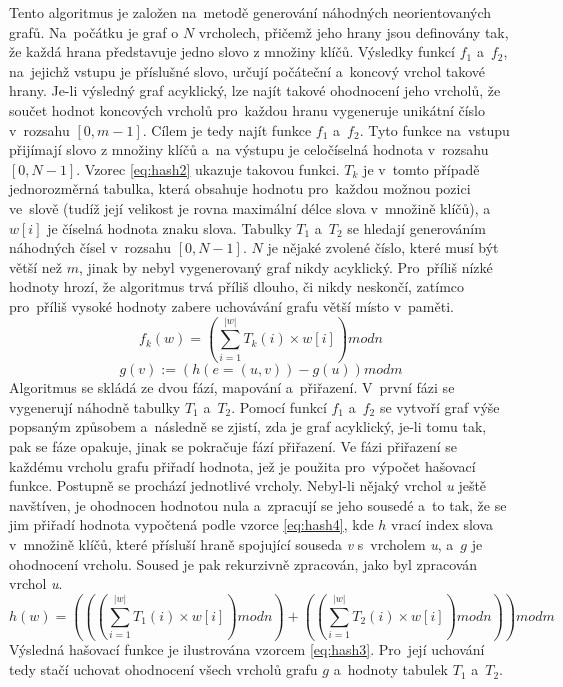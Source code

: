 \documentclass[11pt,twoside,a4paper]{book}
\begin{document}
Tento algoritmus je založen na~metodě generování náhodných neorientovaných grafů. Na~počátku je graf o $N$ vrcholech, přičemž jeho hrany jsou definovány tak, že každá hrana představuje jedno slovo z množiny klíčů. Výsledky funkcí $f_1$ a~$f_2$, na~jejichž vstupu je příslušné slovo, určují počáteční a~koncový vrchol takové hrany. Je-li výsledný graf acyklický, lze najít takové ohodnocení jeho vrcholů, že součet hodnot koncových vrcholů pro~každou hranu vygeneruje unikátní číslo v~rozsahu $[0,m-1]$. Cílem je tedy najít funkce $f_1$ a~$f_2$. Tyto funkce na~vstupu přijímají slovo z množiny klíčů a~na výstupu je celočíselná hodnota v~rozsahu $[0,N-1]$. Vzorec \ref{eq:hash2} ukazuje takovou funkci. $T_k$ je v~tomto případě jednorozměrná tabulka, která obsahuje hodnotu pro~každou možnou pozici ve~slově (tudíž její velikost je rovna maximální délce slova v~množině klíčů), a~$w[i]$ je číselná hodnota znaku slova. Tabulky $T_1$ a~$T_2$ se hledají generováním náhodných čísel v~rozsahu $[0,N-1]$. $N$ je nějaké zvolené číslo, které musí být větší než $m$, jinak by nebyl vygenerovaný graf nikdy acyklický. Pro~příliš nízké hodnoty hrozí, že algoritmus trvá příliš dlouho, či nikdy neskončí, zatímco pro~příliš vysoké hodnoty zabere uchovávání grafu větší místo v~paměti.
\begin{equation} \label{eq:hash2}
f_k(w)=(\sum\limits_{i=1}^{|w|} T_k(i) \times w[i]) mod n
\end{equation}
\begin{equation} \label{eq:hash4}
g(v) := (h(e=(u,v))-g(u)) mod m
\end{equation}
Algoritmus se skládá ze dvou fází, mapování a~přiřazení. V~první fázi se vygenerují náhodně tabulky $T_1$ a~$T_2$. Pomocí funkcí $f_1$ a~$f_2$ se vytvoří graf výše popsaným způsobem a~následně se zjistí, zda je graf acyklický, je-li tomu tak, pak se fáze opakuje, jinak se pokračuje fází přiřazení. 
 Ve fázi přiřazení se každému vrcholu grafu přiřadí hodnota, jež je použita pro~výpočet hašovací funkce. Postupně se prochází jednotlivé vrcholy. Nebyl-li nějaký vrchol \textit{u} ještě navštíven, je ohodnocen hodnotou nula a~zpracují se jeho sousedé a~to tak, že se jim přiřadí hodnota vypočtená podle vzorce \ref{eq:hash4}, kde $h$ vrací index slova v~množině klíčů, které přísluší hraně spojující souseda \textit{v} s~vrcholem \textit{u}, a~$g$ je ohodnocení vrcholu. Soused je pak rekurzivně zpracován, jako byl zpracován vrchol \textit{u}.
\begin{equation} \label{eq:hash3}
h(w) = (((\sum\limits_{i=1}^{|w|} T_1(i) \times w[i]) mod n) + ((\sum\limits_{i=1}^{|w|} T_2(i) \times w[i]) mod n)) mod m
\end{equation}
Výsledná hašovací funkce je ilustrována vzorcem \ref{eq:hash3}.  Pro~její uchování tedy stačí uchovat ohodnocení všech vrcholů grafu $g$ a~hodnoty tabulek $T_1$ a~$T_2$.
\end{document}
